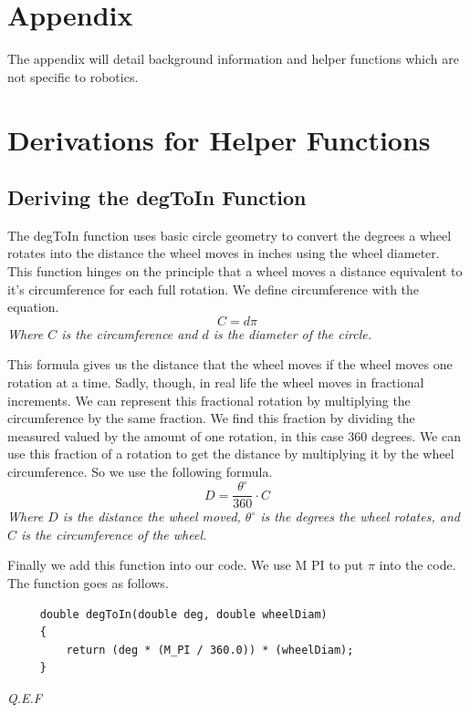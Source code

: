 \documentclass[12pt]{article}
\begin{document}
%
%
\newpage
\appendix
\section*{Appendix}
The appendix will detail background information and helper functions which are not specific to robotics.
\section{Derivations for Helper Functions}
\subsection{Deriving the degToIn Function} \label{app_degToIn}
    The degToIn function uses basic circle geometry to convert the degrees a wheel rotates into the distance the wheel moves in inches using the wheel diameter. This function hinges on the principle that a wheel moves a distance equivalent to it's circumference for each full rotation. We define circumference with the equation.
    $$ C = d\pi $$
    \center\textit{Where $C$ is the circumference and $d$ is the diameter of the circle.}

    \raggedright
    This formula gives us the distance that the wheel moves if the wheel moves one rotation at a time. Sadly, though, in real life the wheel moves in fractional increments. We can represent this fractional rotation by multiplying the circumference by the same fraction. We find this fraction by dividing the measured valued by the amount of one rotation, in this case 360 degrees. We can use this fraction of a rotation to get the distance by multiplying it by the wheel circumference. So we use the following formula.
    $$ D = \frac{\theta^\circ}{360} \cdot C $$
    \center\textit{Where $D$ is the distance the wheel moved, $\theta^\circ$ is the degrees the wheel rotates, and $C$ is the circumference of the wheel.}

    \raggedright
    Finally we add this function into our code. We use M PI to put $\pi$ into the code. The function goes as follows.

    \begin{verbatim}
     double degToIn(double deg, double wheelDiam)
     {
         return (deg * (M_PI / 360.0)) * (wheelDiam);
     }
    \end{verbatim}

    \textit{Q.E.F}

    \pagebreak
\end{document}

